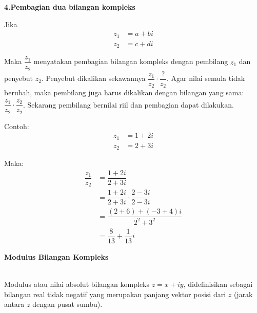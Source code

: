 \documentclass{article}
\begin{document}
\textbf{4.\>Pembagian dua bilangan kompleks\\}

Jika
\begin{align}
    z_1 & = a + bi
    \nonumber      \\
    z_2 & = c + di
    \nonumber
\end{align}

Maka $\dfrac{z_1}{z_2}$ menyatakan pembagian bilangan kompleks dengan pembilang $z_1$ dan penyebut $z_2$. Penyebut dikalikan sekawannya $\dfrac{z_1}{z_2} \cdot \dfrac{?}{z_2}$. Agar nilai semula tidak berubah, maka pembilang juga harus dikalikan dengan bilangan yang sama: $\dfrac{z_1}{z_2} \cdot \dfrac{\overline{z_2}}{z_2}$. Sekarang pembilang bernilai riil dan pembagian dapat dilakukan.

Contoh:
\begin{align}
    z_1 & = 1 + 2i
    \nonumber      \\
    z_2 & = 2 + 3i
    \nonumber
\end{align}

Maka:
\begin{align}
    \dfrac{z_1}{z_2} & = \dfrac{1+2i}{2+3i}
    \nonumber                                                        \\
                     & = \dfrac{1+2i}{2+3i} \cdot \dfrac{2-3i}{2-3i}
    \nonumber                                                        \\
                     & = \dfrac{(2+6)+(-3+4)i}{2^2+3^2}
    \nonumber                                                        \\
                     & = \dfrac{8}{13} + \dfrac{1}{13}i
    \nonumber
\end{align}


\newpage
\begin{center}
    \textbf{Modulus Bilangan Kompleks}
\end{center}
\leavevmode\\

Modulus atau nilai absolut bilangan kompleks $ z = x + iy $, didefinisikan sebagai bilangan real tidak negatif yang merupakan panjang vektor posisi dari $z$ (jarak antara $z$ dengan pusat sumbu).
\\ \\

\\ \\
\end{document}
